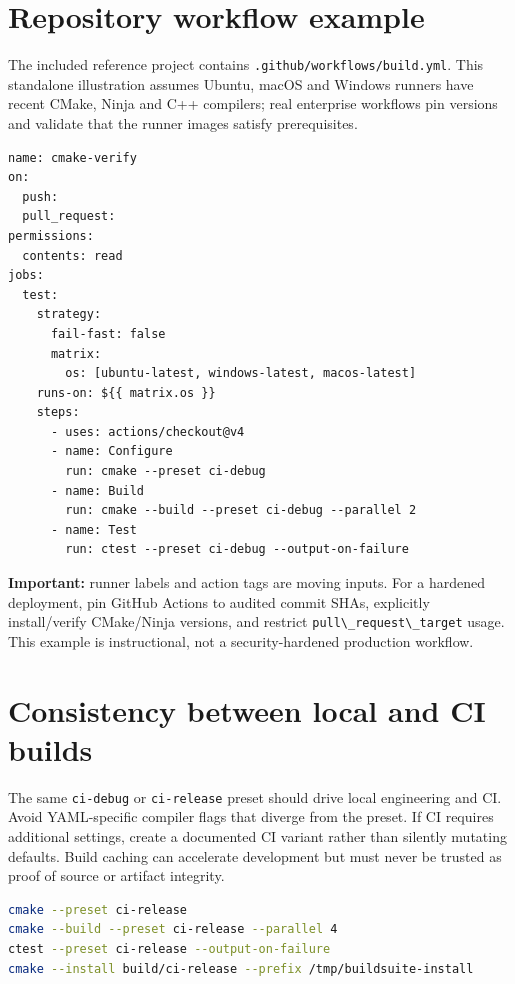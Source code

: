\documentclass[11pt,letterpaper,oneside]{report}
\providecommand{\passthrough}[1]{#1}
\begin{document}
\chapter{Repository workflow example}\label{repository-workflow-example}

The included reference project contains
\passthrough{\lstinline!.github/workflows/build.yml!}. This standalone
illustration assumes Ubuntu, macOS and Windows runners have recent
CMake, Ninja and C++ compilers; real enterprise workflows pin versions
and validate that the runner images satisfy prerequisites.

\begin{lstlisting}
name: cmake-verify
on:
  push:
  pull_request:
permissions:
  contents: read
jobs:
  test:
    strategy:
      fail-fast: false
      matrix:
        os: [ubuntu-latest, windows-latest, macos-latest]
    runs-on: ${{ matrix.os }}
    steps:
      - uses: actions/checkout@v4
      - name: Configure
        run: cmake --preset ci-debug
      - name: Build
        run: cmake --build --preset ci-debug --parallel 2
      - name: Test
        run: ctest --preset ci-debug --output-on-failure
\end{lstlisting}

\textbf{Important:} runner labels and action tags are moving inputs. For
a hardened deployment, pin GitHub Actions to audited commit SHAs,
explicitly install/verify CMake/Ninja versions, and restrict
\passthrough{\lstinline!pull\_request\_target!} usage. This example is
instructional, not a security-hardened production workflow.

\chapter{Consistency between local and CI
builds}\label{consistency-between-local-and-ci-builds}

The same \passthrough{\lstinline!ci-debug!} or
\passthrough{\lstinline!ci-release!} preset should drive local
engineering and CI. Avoid YAML-specific compiler flags that diverge from
the preset. If CI requires additional settings, create a documented CI
variant rather than silently mutating defaults. Build caching can
accelerate development but must never be trusted as proof of source or
artifact integrity.

\begin{lstlisting}[language=sh]
cmake --preset ci-release
cmake --build --preset ci-release --parallel 4
ctest --preset ci-release --output-on-failure
cmake --install build/ci-release --prefix /tmp/buildsuite-install
\end{lstlisting}
\end{document}
